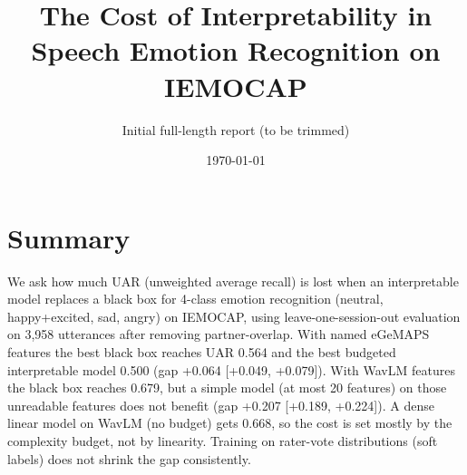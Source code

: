 \documentclass[11pt]{article}
\title{The Cost of Interpretability in Speech Emotion Recognition on IEMOCAP}
\author{Initial full-length report (to be trimmed)}
\date{\today}
\begin{document}
\maketitle
\tableofcontents
\clearpage
\section{Summary}\label{summary}

We ask how much UAR (unweighted average recall) is lost when an interpretable model replaces a black box for 4-class emotion recognition (neutral, happy+excited, sad, angry) on IEMOCAP, using leave-one-session-out evaluation on 3,958 utterances after removing partner-overlap. With named eGeMAPS features the best black box reaches UAR 0.564 and the best budgeted interpretable model 0.500 (gap +0.064 {[}+0.049, +0.079{]}). With WavLM features the black box reaches 0.679, but a simple model (at most 20 features) on those unreadable features does not benefit (gap +0.207 {[}+0.189, +0.224{]}). A dense linear model on WavLM (no budget) gets 0.668, so the cost is set mostly by the complexity budget, not by linearity. Training on rater-vote distributions (soft labels) does not shrink the gap consistently.
\end{document}
